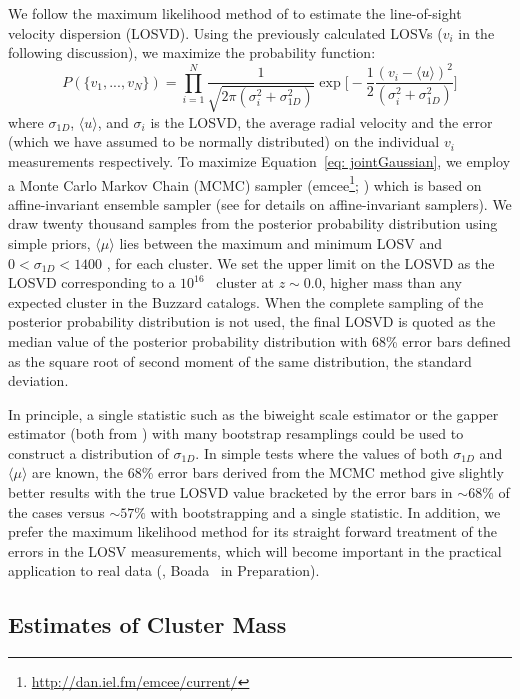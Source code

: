 \documentclass[fleqn,usenatbib]{mnras}
\begin{document}
We follow the maximum likelihood method of \cite{Walker2006} to estimate the line-of-sight velocity dispersion (LOSVD). Using the previously calculated LOSVs ($v_i$ in the following discussion), we maximize the probability function:
\begin{equation}\label{eq: jointGaussian}
P(\{v_1, ..., v_N\})=\displaystyle\prod_{i=1}^{N}\frac{1}{\sqrt{2\pi(\sigma_i^2+\sigma_{1D}^2)}}\exp\biggl[-\frac{1}{2}\frac{(v_i-\langle u \rangle)^2}{(\sigma_i^2+\sigma_{1D}^2)}\biggr]
\end{equation}
	where $\sigma_{1D}$, $\langle u \rangle$, and $\sigma_i$ is the LOSVD, the average radial velocity and the error (which we have assumed to be normally distributed) on the individual $v_i$ measurements respectively. To maximize Equation~\ref{eq: jointGaussian}, we employ a Monte Carlo Markov Chain (MCMC) sampler ({\sc emcee}\footnote{\url{http://dan.iel.fm/emcee/current/}}; \citealt{Foreman-Mackey2013}) which is based on affine-invariant ensemble sampler (see \citealt{Goodman2010} for details on affine-invariant samplers). We draw twenty thousand samples from the posterior probability distribution using simple priors, $\langle\mu\rangle$ lies between the maximum and minimum LOSV and $0< \sigma_{1D} < 1400$ \kms, for each cluster. We set the upper limit on the LOSVD as the LOSVD corresponding to a $10^{16}$ \Msol\ cluster at $z\sim0.0$, higher mass than any expected cluster in the Buzzard catalogs. When the complete sampling of the posterior probability distribution is not used, the final LOSVD is quoted as the median value of the posterior probability distribution with 68\% error bars defined as the square root of second moment of the same distribution, the standard deviation.

In principle, a single statistic such as the biweight scale estimator or the gapper estimator (both from \citealt{Beers1990}) with many bootstrap resamplings could be used to construct a distribution of $\sigma_{1D}$. In simple tests where the values of both $\sigma_{1D}$ and $\langle\mu\rangle$ are known, the 68\% error bars derived from the MCMC method give slightly better results with the true LOSVD value bracketed by the error bars in $\sim68\%$ of the cases versus $\sim57\%$ with bootstrapping and a single statistic. In addition, we prefer the maximum likelihood method for its straight forward treatment of the errors in the LOSV measurements, which will become important in the practical application to real data (\eg, Boada \etal\ in Preparation).

\subsection{Estimates of Cluster Mass}\label{sec: mass}
\end{document}
